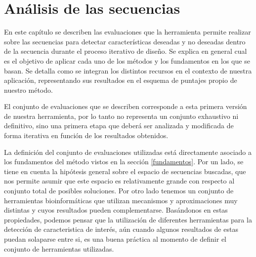 \chapter{Análisis de las secuencias}
\label{tools}

En este capítulo se describen las evaluaciones que la herramienta permite realizar sobre las secuencias para detectar características deseadas y no deseadas dentro de la secuencia durante el proceso iterativo de diseño. 
Se explica en general cual es el objetivo de aplicar cada uno de los métodos y los fundamentos en los que se basan.
Se detalla como se integran los distintos recursos en el contexto de nuestra aplicación, representando sus resultados en el esquema de puntajes propio de nuestro método.

El conjunto de evaluaciones que se describen corresponde a esta primera versión de nuestra herramienta, por lo tanto no representa un conjunto exhaustivo ni definitivo, 
sino una primera etapa que deberá ser analizada y modificada de forma iterativa en función de los resultados obtenidos.

La definición del conjunto de evaluaciones utilizadas está directamente asociado a los fundamentos del método vistos en la sección \ref{fundamentos}.
Por un lado, se tiene en cuenta la hipótesis general sobre el espacio de secuencias buscadas, que nos permite asumir que este espacio es relativamente grande con respecto al conjunto total de posibles soluciones.
Por otro lado tenemos un conjunto de herramientas bioinformáticas que utilizan mecanismos y aproximaciones muy distintas y cuyos resultados pueden complementarse. 
Basándonos en estas propiedades, podemos pensar que la utilización de diferentes herramientas para la detección de caracteristica de interés, aún cuando algunos resultados de estas puedan solaparse entre si,
es una buena práctica al momento de definir el conjunto de herramientas utilizadas. 

